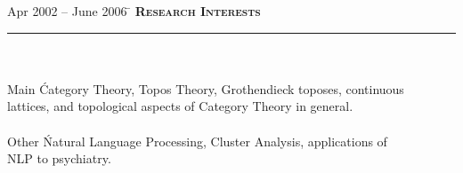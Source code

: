 \documentclass[11pt,a4paper]{article}
\begin{document}
\begin{tabbing} 
Apr 2002 -- June 2006 \=\kill
\> \textbf{\Large{\textsc{Research Interests}}}\\
\> \noindent\rule{11cm}{1pt}\\
\\
\> Main \' Category Theory, Topos Theory, Grothendieck toposes, continuous \\ 
\> lattices, and topological aspects of Category Theory in general. \\
\\
\> Other \' Natural Language Processing, Cluster Analysis, applications of \\ 
\> NLP to psychiatry. 
\\
\end{tabbing}
\end{document}

